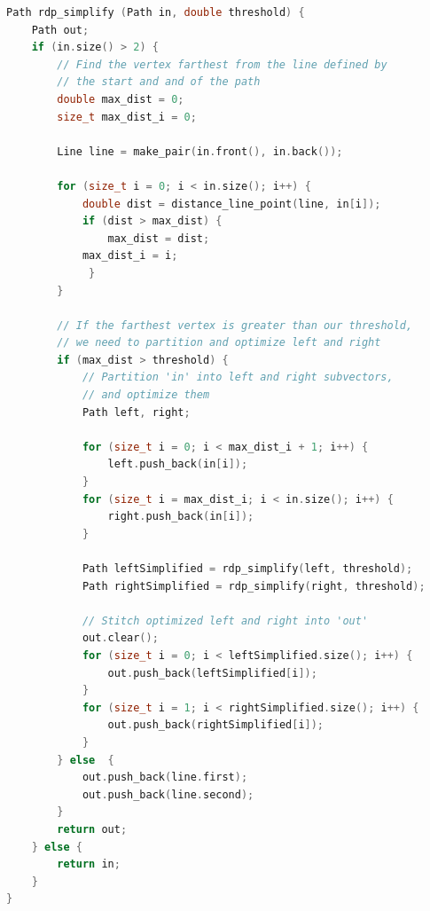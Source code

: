 \documentclass[titlepage,12pt,a4paper]{article}
\begin{document}
\pagebreak


\begin{lstlisting}[language=C++]
Path rdp_simplify (Path in, double threshold) {
    Path out;
    if (in.size() > 2) {
        // Find the vertex farthest from the line defined by 
        // the start and and of the path
        double max_dist = 0;
        size_t max_dist_i = 0;

        Line line = make_pair(in.front(), in.back());

        for (size_t i = 0; i < in.size(); i++) {
            double dist = distance_line_point(line, in[i]);
            if (dist > max_dist) {
                max_dist = dist;
	        max_dist_i = i;
             }
        }

        // If the farthest vertex is greater than our threshold,
        // we need to partition and optimize left and right
        if (max_dist > threshold) {
            // Partition 'in' into left and right subvectors,
            // and optimize them
            Path left, right;

            for (size_t i = 0; i < max_dist_i + 1; i++) {
                left.push_back(in[i]);
            }
            for (size_t i = max_dist_i; i < in.size(); i++) {
                right.push_back(in[i]);
            }

            Path leftSimplified = rdp_simplify(left, threshold);
            Path rightSimplified = rdp_simplify(right, threshold);

            // Stitch optimized left and right into 'out'
            out.clear();
            for (size_t i = 0; i < leftSimplified.size(); i++) {
                out.push_back(leftSimplified[i]);
            }
            for (size_t i = 1; i < rightSimplified.size(); i++) {
                out.push_back(rightSimplified[i]);
            }
        } else  {
            out.push_back(line.first);
            out.push_back(line.second);
        }
        return out;
    } else {
        return in;
    }
}
	
\end{lstlisting}
\end{document}
